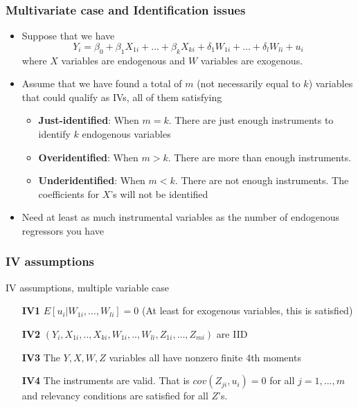 \documentclass[aspectratio=169]{beamer}
\begin{document}
\begin{frame}
\frametitle{Multivariate case and Identification issues}
\begin{itemize}
\item Suppose that we have
\[
Y_i = \beta_0 + \beta_1X_{1i} +...+ \beta_kX_{ki} + \delta_1W_{1i}+...+\delta_lW_{li}+u_i 
\]
where $X$ variables are endogenous and $W$ variables are exogenous. 
\item Assume that we have found a total of $m$ (not necessarily equal to $k$) variables that could qualify as IVs, all of them satisfying 

\begin{itemize}
\item \textbf{Just-identified}: When $m=k$. There are just enough instruments to identify $k$ endogenous variables
\item \textbf{Overidentified}: When $m>k$. There are more than enough instruments.\item \textbf{Underidentified}: When $m<k$. There are not enough instruments. The coefficients for $X$'s will not be identified 
\end{itemize}
\item Need at least as much instrumental variables as the number of endogenous regressors you have
\end{itemize}
\end{frame}

\begin{frame}
\frametitle{IV assumptions}
\begin{block}{IV assumptions, multiple variable case}

\begin{itemize}
\item[\textbf{IV1}] $E[u_i|W_{1i},...,W_{li}]=0$ (At least for exogenous variables, this is satisfied)
\item[\textbf{IV2}] $(Y_i,X_{1i},..,X_{ki},W_{1i},..,W_{li},Z_{1i},...,Z_{mi})$ are IID
\item[\textbf{IV3}] The $Y,X,W,Z$ variables all have nonzero finite 4th moments
\item[\textbf{IV4}] The instruments are valid. That is $cov(Z_{ji},u_i)=0$ for all $j=1,...,m$ and relevancy conditions are satisfied for all $Z$'s. 
\end{itemize}

\end{block}
\end{frame}
\end{document}
